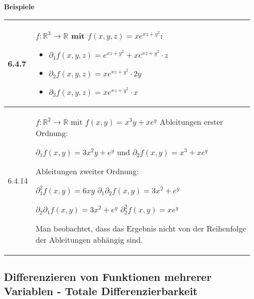     \noindent
    \textbf{Beispiele}
    \begin{table}[H]
    \begin{tabularx}{\textwidth}{X m{16cm}}
        \toprule

        6.4.7 & $f: \mathbb{R}^3 \rightarrow \mathbb{R}$ mit $f(x,y,z) = xe^{xz+y^2}$: 
                \begin{itemize}
                    \item[] $\partial_1 f(x,y,z) = e^{xz+y^2} + xe^{xz+y^2} \cdot z$ 
                    \item[] $\partial_2 f(x,y,z) = xe^{xz+y^2} \cdot 2y$
                    \item[] $\partial_3 f(x,y,z) = xe^{xz+y^2} \cdot x$
                \end{itemize}\\
        \midrule
        6.4.14& $f: \mathbb{R}^2 \rightarrow \mathbb{R}$ mit $f(x,y) = x^3 y + x e^y$ \hfill \break
                Ableitungen erster Ordnung: \hfill \break
                \centerline{$ \partial_1f(x,y) = 3x^2y + e^y$ und $\partial_2f(x,y) = x^3 + xe^y$}
                Ableitungen zweiter Ordnung: \hfill \break
                \centerline{$\partial_1^2 f(x,y) =6xy$ \hspace{1cm} $\partial_1 \partial_2f(x,y) = 3x^2 + e^y $}
                \centerline{$ \partial_2 \partial_1 f(x,y) = 3x^2 + e^y$ \hspace{1cm} $\partial_2^2f(x,y) = xe^y$} 
                Man beobachtet, dass das Ergebnis nicht von der Reihenfolge der Ableitungen abhängig sind. \\

        \bottomrule
    \end{tabularx}
    \end{table}

\subsection{Differenzieren von Funktionen mehrerer Variablen - Totale Differenzierbarkeit}

